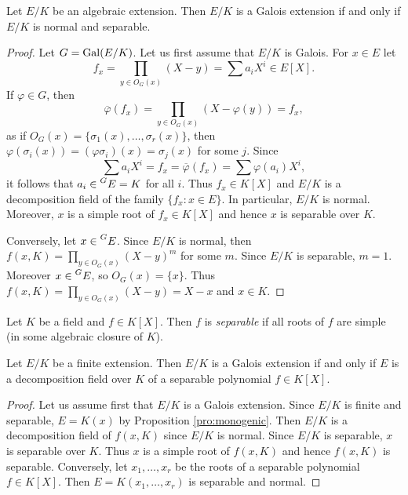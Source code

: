 \begin{proposition}
\label{pro:normal+separable}
    Let $E/K$ be an algebraic extension. Then $E/K$ is a Galois extension
    if and only if $E/K$ is normal and separable. 
\end{proposition}

\begin{proof}
    Let $G=\operatorname{Gal}(E/K)$. Let us first assume that $E/K$ is Galois. For $x\in E$ let 
    \[
    f_x=\prod_{y\in O_G(x)}(X-y)=\sum a_iX^i\in E[X].
    \]
    If $\varphi\in G$, then 
    \[
    \overline{\varphi}(f_x)=\prod_{y\in O_G(x)}(X-\varphi(y))=f_x,
    \]
    as if $O_G(x)=\{\sigma_1(x),\dots,\sigma_r(x)\}$, then 
    $\varphi(\sigma_i(x))=(\varphi\sigma_i)(x)=\sigma_j(x)$ for some $j$. 
    Since 
    \[
    \sum a_iX^i=f_x=\overline{\varphi}(f_x)=\sum\varphi(a_i)X^i,
    \]
    it follows that $a_i\in\prescript{G}{}{E}=K$ for all $i$. 
    Thus $f_x\in K[X]$
    and $E/K$ is a decomposition field of the family $\{f_x:x\in E\}$. In particular, 
    $E/K$ is normal. Moreover, $x$ is a simple root of $f_x\in K[X]$ and hence
    $x$ is separable over $K$. 

    Conversely, let $x\in \prescript{G}{}{E}$. Since $E/K$ is normal, then 
    $f(x,K)=\prod_{y\in O_G(x)}(X-y)^m$ for some $m$.
    Since $E/K$ is separable, 
    $m=1$.
    Moreover $x\in \prescript{G}{}{E}$, so $O_G(x)=\{x\}$.
    Thus $f(x,K)=\prod_{y\in O_G(x)}(X-y)=X-x$ and $x\in K$. 
\end{proof}

\begin{definition}
Let $K$ be a field and $f\in K[X]$. Then $f$ is \emph{separable}
if all roots of $f$ are simple (in some algebraic closure of $K$). 
\end{definition}

\begin{proposition}
    Let $E/K$ be a finite extension. Then $E/K$ is a Galois extension 
    if and only if $E$ is a decomposition field over $K$ 
    of a separable polynomial $f\in K[X]$. 
\end{proposition}

\begin{proof}
    Let us assume first that $E/K$ is a Galois extension. Since
    $E/K$ is finite and separable, $E=K(x)$ by Proposition \ref{pro:monogenic}. 
    Then $E/K$ is a decomposition field of $f(x,K)$ since
    $E/K$ is normal. Since $E/K$ is separable, $x$ is separable over $K$. Thus $x$ is 
    a simple root of $f(x,K)$ and hence $f(x,K)$ is separable. 
    Conversely, let $x_1,\dots,x_r$ be the roots of a separable polynomial $f\in K[X]$.
    Then $E=K(x_1,\dots,x_r)$ is separable and normal.  
\end{proof}

